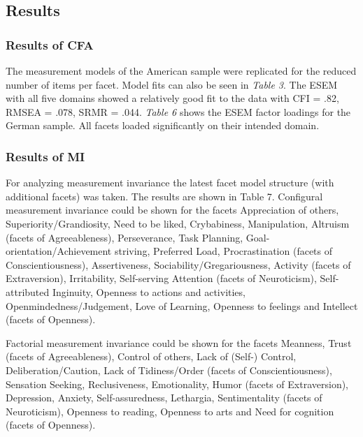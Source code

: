 \documentclass[,man,floatsintext]{apa6}
\begin{document}
\subsection{Results}\label{results-1}

\subsubsection{Results of CFA}\label{results-of-cfa}

The measurement models of the American sample were replicated for the
reduced number of items per facet. Model fits can also be seen in
\emph{Table 3}. The ESEM with all five domains showed a relatively good
fit to the data with CFI = .82, RMSEA = .078, SRMR = .044. \emph{Table
6} shows the ESEM factor loadings for the German sample. All facets
loaded significantly on their intended domain.

\vspace{5mm}

\vspace{5mm}

\subsubsection{Results of MI}\label{results-of-mi}

For analyzing measurement invariance the latest facet model structure
(with additional facets) was taken. The results are shown in Table 7.
Configural measurement invariance could be shown for the facets
Appreciation of others, Superiority/Grandiosity, Need to be liked,
Crybabiness, Manipulation, Altruism (facets of Agreeableness),
Perseverance, Task Planning, Goal-orientation/Achievement striving,
Preferred Load, Procrastination (facets of Conscientiousness),
Assertiveness, Sociability/Gregariousness, Activity (facets of
Extraversion), Irritability, Self-serving Attention (facets of
Neuroticism), Self-attributed Inginuity, Openness to actions and
activities, Openmindedness/Judgement, Love of Learning, Openness to
feelings and Intellect (facets of Openness).

Factorial measurement invariance could be shown for the facets Meanness,
Trust (facets of Agreeableness), Control of others, Lack of (Self-)
Control, Deliberation/Caution, Lack of Tidiness/Order (facets of
Conscientiousness), Sensation Seeking, Reclusiveness, Emotionality,
Humor (facets of Extraversion), Depression, Anxiety, Self-assuredness,
Lethargia, Sentimentality (facets of Neuroticism), Openness to reading,
Openness to arts and Need for cognition (facets of Openness).
\end{document}
